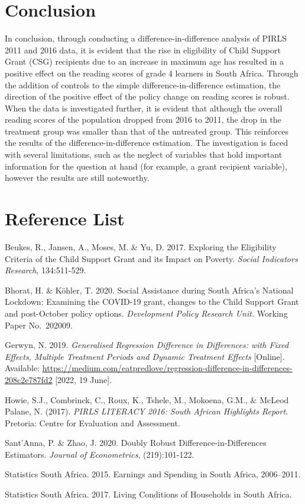 \documentclass[11pt,preprint, authoryear]{elsarticle}
\numberwithin{equation}{section}
\numberwithin{figure}{section}
\numberwithin{table}{section}
\begin{document}
\hypertarget{conclusion}{%
\section{Conclusion}\label{conclusion}}

In conclusion, through conducting a difference-in-difference analysis of
PIRLS 2011 and 2016 data, it is evident that the rise in eligibility of
Child Support Grant (CSG) recipients due to an increase in maximum age
has resulted in a positive effect on the reading scores of grade 4
learners in South Africa. Through the addition of controls to the simple
difference-in-difference estimation, the direction of the positive
effect of the policy change on reading scores is robust. When the data
is investigated further, it is evident that although the overall reading
scores of the population dropped from 2016 to 2011, the drop in the
treatment group was smaller than that of the untreated group. This
reinforces the results of the difference-in-difference estimation. The
investigation is faced with several limitations, such as the neglect of
variables that hold important information for the question at hand (for
example, a grant recipient variable), however the results are still
noteworthy.

\newpage

\hypertarget{reference-list}{%
\section{Reference List}\label{reference-list}}

Beukes, R., Jansen, A., Moses, M. \& Yu, D. 2017. Exploring the
Eligibility Criteria of the Child Support Grant and its Impact on
Poverty. \emph{Social Indicators Research}, 134:511-529.

Bhorat, H. \& Köhler, T. 2020. Social Assistance during South Africa's
National Lockdown: Examining the COVID-19 grant, changes to the Child
Support Grant and post-October policy options. \emph{Development Policy
Research Unit.} Working Paper No.~202009.

Gerwyn, N. 2019. \emph{Generalised Regression Difference in Differences:
with Fixed Effects, Multiple Treatment Periods and Dynamic Treatment
Effects} {[}Online{]}. Available:
\url{https://medium.com/eatpredlove/regression-difference-in-differences-208c2e787fd2}
{[}2022, 19 June{]}.

Howie, S.J., Combrinck, C., Roux, K., Tshele, M., Mokoena, G.M., \&
McLeod Palane, N. (2017). \emph{PIRLS LITERACY 2016: South African
Highlights Report.} Pretoria: Centre for Evaluation and Assessment.

Sant'Anna, P. \& Zhao, J. 2020. Doubly Robust Difference-in-Differences
Estimators. \emph{Journal of Econometrics}, (219):101-122.

Statistics South Africa. 2015. Earnings and Spending in South Africa,
2006--2011.

Statistics South Africa. 2017. Living Conditions of Households in South
Africa.


\end{document}
